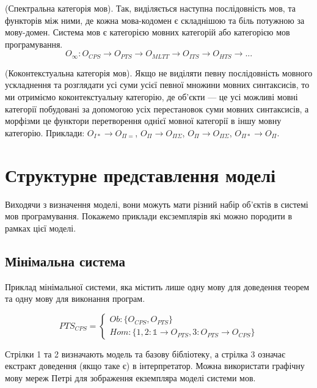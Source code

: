 \begin{definition} (Спектральна категорія мов).
Так, виділяється наступна послідовність мов, та функторів між ними,
де кожна мова-кодомен є складнішою та біль потужною за мову-домен.
Система мов є категорією мовних категорій або категорією мов програмування.
\begin{equation}
O_\infty : O_{CPS} \rightarrow O_{PTS} \rightarrow O_{MLTT} \rightarrow O_{ITS} \rightarrow O_{HTS} \rightarrow ...
\end{equation}
\end{definition}

\begin{definition} (Коконтекстуальна категорія мов).
Якщо не виділяти певну послідовність мовного ускладнення та розглядати
усі суми усієї певної множини мовних синтаксисів, то ми отриміємо коконтекстуальну категорію,
де об'єкти --- це усі можливі мовні категорії побудовані за допомогою усіх перестановок суми мовних синтаксисів,
а морфізми це функтори перетворення однієї мовної категорії в іншу мовну категорію.
Приклади: $O_{I*} \rightarrow O_{\Pi=}$, $O_\Pi \rightarrow O_{\Pi\Sigma}$,
$O_\Pi \rightarrow O_{\Pi\Sigma}$, $O_{\Pi*} \rightarrow O_\Pi$.
\end{definition}

\section{Структурне представлення моделі}
Виходячи з визначення моделі, вони можуть мати різний
набір об'єктів в системі мов програмування.
Покажемо приклади ексземплярів які можно породити в рамках цієї моделі.

\subsection{Мінімальна система}
Приклад мінімальної системи, яка містить лише одну мову для доведення теорем
та одну мову для виконання програм.

\begin{equation}
PTS_{CPS} = 
\begin{cases}
Ob: \{ O_{CPS}, O_{PTS} \} \\
Hom: \{ 1,2: \mathbb{1} \rightarrow O_{PTS}, 3: O_{PTS} \rightarrow O_{CPS} \}
\end{cases}
\end{equation}

Стрілки 1 та 2 визначають
модель та базову бібліотеку, а стрілка 3 означає екстракт
доведення (якщо таке є) в інтерпретатор. Можна використати графічну
мову мереж Петрі для зображення екземпляра моделі системи мов.


